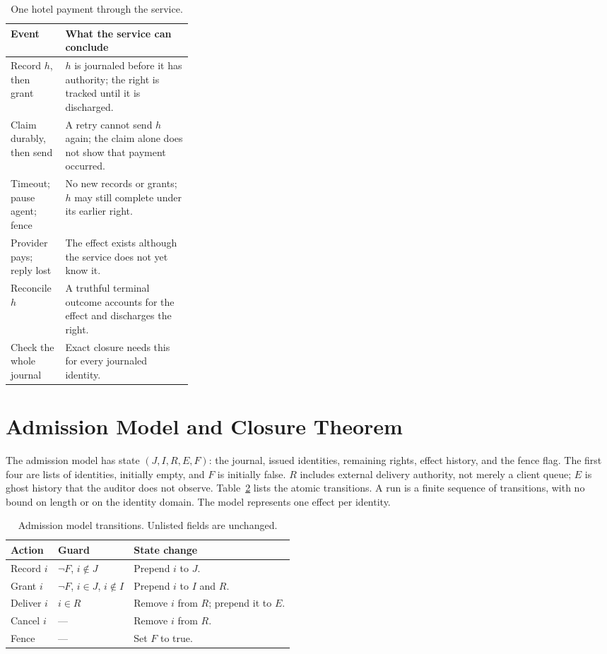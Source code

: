 \documentclass[runningheads]{llncs}
\begin{document}
\begin{table}[t]
\centering\small
\caption{One hotel payment through the service.}
\label{tab:hotel}
\begin{tabularx}{\linewidth}{@{}>{\raggedright\arraybackslash}p{0.30\linewidth} X@{}}
\toprule
Event & What the service can conclude \\
\midrule
Record $h$, then grant & $h$ is journaled before it has authority; the right is tracked until it is discharged. \\
Claim durably, then send & A retry cannot send $h$ again; the claim alone does not show that payment occurred. \\
Timeout; pause agent; fence & No new records or grants; $h$ may still complete under its earlier right. \\
Provider pays; reply lost & The effect exists although the service does not yet know it. \\
Reconcile $h$ & A truthful terminal outcome accounts for the effect and discharges the right. \\
Check the whole journal & Exact closure needs this for every journaled identity. \\
\bottomrule
\end{tabularx}
\end{table}

\section{Admission Model and Closure Theorem}
\label{sec:theorem}
The admission model has state $(J,I,R,E,F)$: the journal, issued identities,
remaining rights, effect history, and the fence flag. The first four are lists
of identities, initially empty, and $F$ is initially false. $R$ includes
external delivery authority, not merely a client queue; $E$ is ghost history
that the auditor does not observe. Table~\ref{tab:steps} lists the atomic
transitions. A run is a finite sequence of transitions, with no bound on length
or on the identity domain. The model represents one effect per identity.

\begin{table}[t]
\centering\small
\caption{Admission model transitions. Unlisted fields are unchanged.}
\label{tab:steps}
\begin{tabularx}{\linewidth}{@{}l X X@{}}
\toprule
Action & Guard & State change \\
\midrule
Record $i$ & $\neg F$, $i\notin J$ & Prepend $i$ to $J$. \\
Grant $i$ & $\neg F$, $i\in J$, $i\notin I$ & Prepend $i$ to $I$ and $R$. \\
Deliver $i$ & $i\in R$ & Remove $i$ from $R$; prepend it to $E$. \\
Cancel $i$ & --- & Remove $i$ from $R$. \\
Fence & --- & Set $F$ to true. \\
\bottomrule
\end{tabularx}
\end{table}
\end{document}
